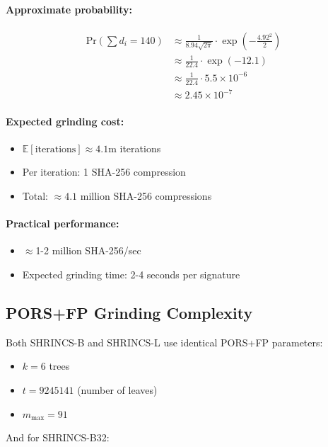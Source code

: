 \paragraph{Approximate probability:}
\begin{align}
    \text{Pr}\left(\sum d_i = 140\right) &\approx \frac{1}{8.94\sqrt{2\pi}} \cdot \exp\left(-\frac{4.92^2}{2}\right) \nonumber \\
    &\approx \frac{1}{22.4} \cdot \exp(-12.1) \nonumber \\
    &\approx \frac{1}{22.4} \cdot 5.5 \times 10^{-6} \nonumber \\
    &\approx 2.45 \times 10^{-7}
\end{align}

\paragraph{Expected grinding cost:}
\begin{itemize}
    \item $\mathbb{E}[\text{iterations}] \approx 4.1$m iterations
    \item Per iteration: 1 SHA-256 compression
    \item Total: $\approx 4.1$ million SHA-256 compressions
\end{itemize}

\paragraph{Practical performance:}
\begin{itemize}
    \item  $\approx$1-2 million SHA-256/sec
    \item Expected grinding time: 2-4 seconds per signature
\end{itemize}

\subsection{PORS+FP Grinding Complexity}
Both SHRINCS-B and SHRINCS-L use identical PORS+FP parameters:
\begin{itemize}
    \item $k = 6$ trees
    \item $t = 9245141$ (number of leaves)
    \item $m_{\max} = 91$
\end{itemize}

And for SHRINCS-B32:

